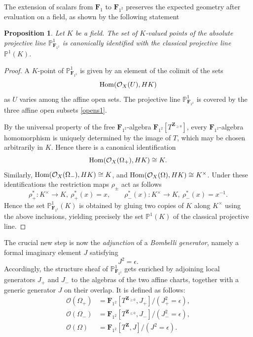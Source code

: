 \documentclass[11pt,a4paper]{article}
\newtheorem{proposition}[theorem]{Proposition}
\renewcommand{\P}{\mathbb{P}}
\newcommand{\Z}{\mathbf{Z}}
\newcommand{\Fone}{\mathbf{F}_{1}}
\newcommand{\Ftwo}{\mathbf{F}_{1^2}}
\newcommand{\Hom}{{\rm{Hom}}}
\begin{document}
The extension of scalars from $\Fone$ to $\Ftwo$ preserves the expected geometry after
evaluation on a field, as shown by the following statement

\begin{proposition}\label{prop:points_P1}
Let $K$ be a field. The set of $K$-valued points of the absolute projective
line $\P^1_{\Ftwo}$ is canonically identified with the classical   projective line $\P^1(K)$.
\end{proposition}



\begin{proof}
A $K$-point of $\P^1_{\Ftwo}$ is given by an element of the colimit of the sets $$\Hom(\mathcal O_X(U),HK)$$ as $U$ varies among the affine open sets. 
The projective line $\P^1_{\Ftwo}$ is covered by the three affine open subsets \eqref{opens1}.

By the universal property of the free $\Ftwo$-algebra
$\Ftwo[T^{\Z_{\ge0}}]$, every $\Ftwo$-algebra homomorphism is uniquely
determined by the image of $T$, which may be chosen arbitrarily in $K$. Hence there is a canonical
identification
\[
\Hom(\mathcal O_X(\Omega_+),HK) \cong K.
\]
Similarly,
$
\Hom(\mathcal O_X(\Omega_-),HK) \cong K$, and $\Hom(\mathcal O_X(\Omega),HK) \cong K^\times$.
Under these identifications the restriction maps $\rho_\pm$ act as follows 
\[
\rho_+^*: K^\times \to K, ~\rho_+^*(x)=x, \qquad \rho_-^*(x): K^\times \to K,~\rho_-^*(x)=x^{-1}.
\]
Hence the set $\P^1_{\Ftwo}(K)$ is obtained by gluing two copies of $K$ along $K^\times$ using the above inclusions, 
 yielding
precisely the set $\P^1(K)$ of the classical projective line.
\end{proof}

The crucial new step is now the \emph{adjunction} of a \emph{Bombelli generator},
namely a formal imaginary element $J$ satisfying
\[
J^2=\epsilon.
\]
Accordingly, the structure sheaf  of $\P^1_{\Ftwo}$ gets enriched by adjoining local 
generators $J_+$ and $J_-$ to the algebras of  the two affine charts, together with a generic
generator $J$ on their overlap. It is defined as follows:
\begin{equation}\label{opens}
\begin{aligned}
\mathcal{O}(\Omega_+) &= \Ftwo[T^{\Z_{\ge0}},J_+]/(J_+^2=\epsilon),\\
\mathcal{O}(\Omega_-) &= \Ftwo[T^{\Z_{\le0}},J_-]/(J_-^2=\epsilon),\\
\mathcal{O}(\Omega)   &= \Ftwo[T^{\Z},J]/(J^2=\epsilon).
\end{aligned}
\end{equation}
\end{document}
